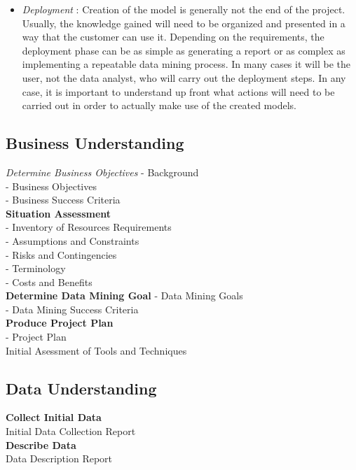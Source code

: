 \documentclass[12pt,a4paper,titlepage]{report}\usepackage{graphicx, color}
\begin{document}
\begin{itemize}
  \item \emph{Deployment} :
  Creation of the model is generally not the end of the project. Usually, the knowledge gained
will need to be organized and presented in a way that the customer can use it. Depending on
the requirements, the deployment phase can be as simple as generating a report or as complex
as implementing a repeatable data mining process. In many cases it will be the user, not the
data analyst, who will carry out the deployment steps. In any case, it is important to
understand up front what actions will need to be carried out in order to actually make use of
the created models.

\end{itemize}

\subsection{Business Understanding}

\emph{Determine Business Objectives}
- Background \\
- Business Objectives \\
- Business Success Criteria \\

\textbf{Situation Assessment} \\
- Inventory of Resources Requirements \\
- Assumptions and Constraints \\
- Risks and Contingencies \\
- Terminology \\
- Costs and Benefits \\

\textbf{Determine Data Mining Goal} 
- Data Mining Goals \\
- Data Mining Success Criteria \\

\textbf{Produce Project Plan} \\ 
- Project Plan \\

Initial Asessment of Tools and Techniques 

\subsection{Data Understanding} 
\textbf{Collect Initial Data} \\
Initial Data Collection Report \\

\textbf{Describe Data} \\
Data Description Report \\
\end{document}
